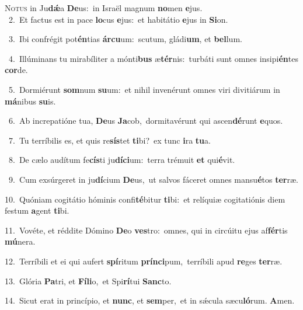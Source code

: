 \lettrine{\initial\textcolor{\initialcolor}{N}}{otus} in Ju\-\textbf{dǽ}\-a \textbf{De}\-us:~\star in Israël magnum \textbf{no}\-men \textbf{e}\-jus.\\
{\numbfont\textcolor{\numbcolor}{~2.}}~Et factus est in pace \textbf{lo}\-cus \textbf{e}\-jus:~\star et habitátio \textbf{e}\-jus in \textbf{Si}\-on.\par
{\numbfont\textcolor{\numbcolor}{~3.}}~Ibi confrégit pot\-\textbf{én}\-tias \textbf{ár}\-\textbf{cu}um:~\star scutum, gládi\-\textbf{um}\-, et \textbf{bel}\-lum.\par
{\numbfont\textcolor{\numbcolor}{~4.}}~Illúminans tu mirabíliter a mónti\textbf{bus} æ\-\textbf{tér}\-nis:~\star turbáti sunt omnes insipi\-\textbf{én}\-tes \textbf{cor}\-de.\par
{\numbfont\textcolor{\numbcolor}{~5.}}~Dormiérunt \textbf{som}\-num \textbf{su}\-um:~\star et nihil invenérunt omnes viri divitiárum in \textbf{má}\-nibus \textbf{su}\-is.\par
{\numbfont\textcolor{\numbcolor}{~6.}}~Ab increpatióne tua, \textbf{De}\-us \textbf{Ja}\-cob,~\star dormitavérunt qui ascen\-\textbf{dé}\-runt \textbf{e}\-quos.\par
{\numbfont\textcolor{\numbcolor}{~7.}}~Tu terríbilis es, et quis re\-\textbf{sís}\-tet \textbf{ti}\-bi?~\star ex tunc \textbf{i}\-ra \textbf{tu}\-a.\par
{\numbfont\textcolor{\numbcolor}{~8.}}~De cælo audítum fe\-\textbf{cís}\-ti ju\-\textbf{dí}\-\textbf{ci}um:~\star terra trémuit \textbf{et} qui\-\textbf{é}\-vit.\par
{\numbfont\textcolor{\numbcolor}{~9.}}~Cum exsúrgeret in ju\-\textbf{dí}\-cium \textbf{De}\-us,~\star ut salvos fáceret omnes mansu\-\textbf{é}\-tos \textbf{ter}\-ræ.\par
{\numbfont\textcolor{\numbcolor}{10.}}~Quóniam cogitátio hóminis confi\-\textbf{té}\-bitur \textbf{ti}\-bi:~\star et relíquiæ cogitatiónis diem festum \textbf{a}\-gent \textbf{ti}\-bi.\par
{\numbfont\textcolor{\numbcolor}{11.}}~Vovéte, et réddite Dómino \textbf{De}\-o \textbf{ves}\-tro:~\star omnes, qui in circúitu ejus af\-\textbf{fér}\-tis \textbf{mú}\-nera.\par
{\numbfont\textcolor{\numbcolor}{12.}}~Terríbili et ei qui aufert \textbf{spí}\-ritum \textbf{prín}\-\textbf{ci}pum,~\star terríbili apud \textbf{re}\-ges \textbf{ter}\-ræ.\par
{\numbfont\textcolor{\numbcolor}{13.}}~Glória \textbf{Pa}\-tri, et \textbf{Fí}\-\textbf{li}o,~\star et Spi\-\textbf{rí}\-tui \textbf{Sanc}\-to.\par
{\numbfont\textcolor{\numbcolor}{14.}}~Sicut erat in princípio, et \textbf{nunc}\-, et \textbf{sem}\-per,~\star et in sǽcula sæcu\-\textbf{ló}\-rum. \textbf{A}\-men.\par
